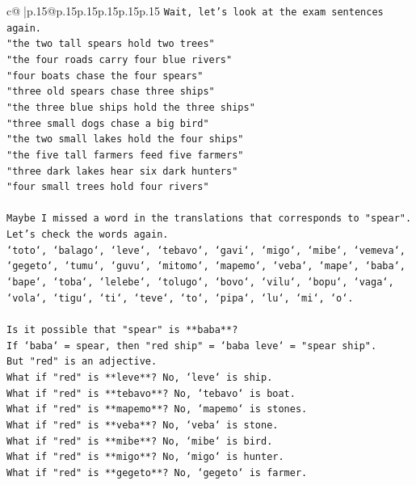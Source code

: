 \documentclass{article}
\begin{document}
{\begin{supertabular}{c@{$\;$}|p{.15\linewidth}@{}p{.15\linewidth}p{.15\linewidth}p{.15\linewidth}p{.15\linewidth}p{.15\linewidth}}
{{{\texttt{Wait, let's look at the exam sentences again.} \\
\texttt{"the two tall spears hold two trees"} \\
\texttt{"the four roads carry four blue rivers"} \\
\texttt{"four boats chase the four spears"} \\
\texttt{"three old spears chase three ships"} \\
\texttt{"the three blue ships hold the three ships"} \\
\texttt{"three small dogs chase a big bird"} \\
\texttt{"the two small lakes hold the four ships"} \\
\texttt{"the five tall farmers feed five farmers"} \\
\texttt{"three dark lakes hear six dark hunters"} \\
\texttt{"four small trees hold four rivers"} \\
\\ 
\texttt{Maybe I missed a word in the translations that corresponds to "spear".} \\
\texttt{Let's check the words again.} \\
\texttt{`toto`, `balago`, `leve`, `tebavo`, `gavi`, `migo`, `mibe`, `vemeva`, `gegeto`, `tumu`, `guvu`, `mitomo`, `mapemo`, `veba`, `mape`, `baba`, `bape`, `toba`, `lelebe`, `tolugo`, `bovo`, `vilu`, `bopu`, `vaga`, `vola`, `tigu`, `ti`, `teve`, `to`, `pipa`, `lu`, `mi`, `o`.} \\
\\ 
\texttt{Is it possible that "spear" is **baba**?} \\
\texttt{If `baba` = spear, then "red ship" = `baba leve` = "spear ship".} \\
\texttt{But "red" is an adjective.} \\
\texttt{What if "red" is **leve**? No, `leve` is ship.} \\
\texttt{What if "red" is **tebavo**? No, `tebavo` is boat.} \\
\texttt{What if "red" is **mapemo**? No, `mapemo` is stones.} \\
\texttt{What if "red" is **veba**? No, `veba` is stone.} \\
\texttt{What if "red" is **mibe**? No, `mibe` is bird.} \\
\texttt{What if "red" is **migo**? No, `migo` is hunter.} \\
\texttt{What if "red" is **gegeto**? No, `gegeto` is farmer.} \\
}}}
\end{supertabular}}
\end{document}
